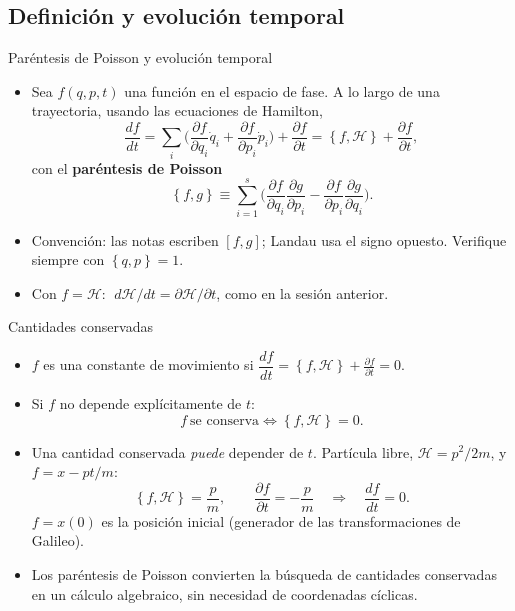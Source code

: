 \documentclass[spanish]{beamer}
\newcommand{\Ham}{\mathcal{H}}               %
\newcommand{\pd}[2]{\frac{\partial #1}{\partial #2}}
\newcommand{\pb}[2]{\left\{#1,#2\right\}}    %
\begin{document}
\subsection{Definición y evolución temporal}
\begin{frame}{Paréntesis de Poisson y evolución temporal}
\begin{itemize}[<+->]
  \item Sea $f(q,p,t)$ una función en el espacio de fase. A lo largo de una trayectoria,
        usando las ecuaciones de Hamilton,
        \[
          \frac{df}{dt}=\sum_i\Big(\pd{f}{q_i}\dot q_i+\pd{f}{p_i}\dot p_i\Big)+\pd{f}{t}
          =\pb{f}{\Ham}+\pd{f}{t},
        \]
        con el \textbf{paréntesis de Poisson}
        \[
          \pb{f}{g}\equiv\sum_{i=1}^s\Big(\pd{f}{q_i}\pd{g}{p_i}-\pd{f}{p_i}\pd{g}{q_i}\Big).
        \]
  \item Convención: las notas escriben $[f,g]$; Landau usa el signo opuesto.
        Verifique siempre con $\pb{q}{p}=1$.
  \item Con $f=\Ham$: $\;d\Ham/dt=\partial\Ham/\partial t$, como en la sesión anterior.
\end{itemize}
\end{frame}

\begin{frame}{Cantidades conservadas}
\begin{itemize}[<+->]
  \item $f$ es una constante de movimiento si $\dfrac{df}{dt}=\pb{f}{\Ham}+\pd{f}{t}=0$.
  \item Si $f$ no depende explícitamente de $t$:
        \[
          f\ \text{se conserva}\iff\pb{f}{\Ham}=0 .
        \]
  \item Una cantidad conservada \emph{puede} depender de $t$. Partícula libre,
        $\Ham=p^2/2m$, y $f=x-pt/m$:
        \[
          \pb{f}{\Ham}=\frac{p}{m},\qquad\pd{f}{t}=-\frac{p}{m}
          \quad\Rightarrow\quad\frac{df}{dt}=0 .
        \]
        $f=x(0)$ es la posición inicial (generador de las transformaciones de Galileo).
  \item Los paréntesis de Poisson convierten la búsqueda de cantidades conservadas en
        un cálculo algebraico, sin necesidad de coordenadas cíclicas.
\end{itemize}
\end{frame}
\end{document}
